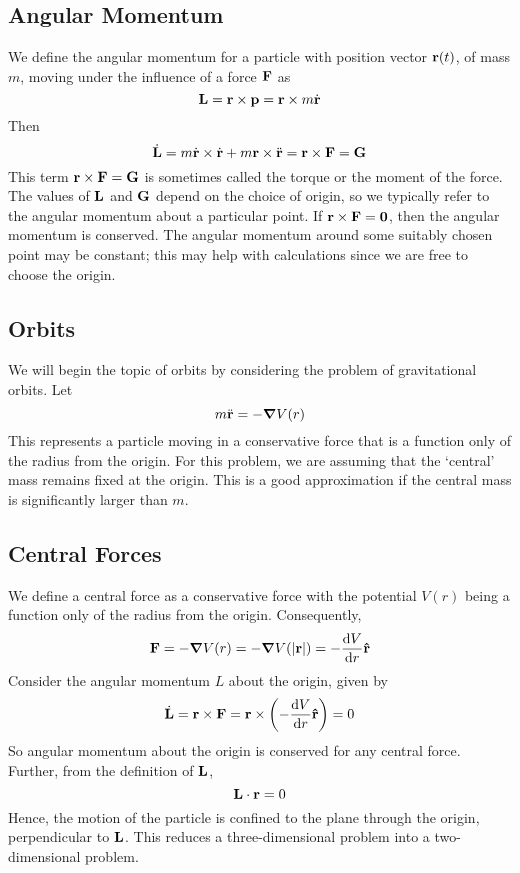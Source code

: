 \subsection{Angular Momentum}
We define the angular momentum for a particle with position vector \(\vb r(t)\), of mass \(m\), moving under the influence of a force \(\vb F\) as
\[ \vb L = \vb r \times \vb p = \vb r \times m \dot{\vb r} \]
Then
\[ \dot{\vb L} = m\dot{\vb r} \times \dot{\vb r} + m\vb r \times \ddot{\vb r} = \vb r \times \vb F = \vb G \]
This term \(\vb r \times \vb F = \vb G\) is sometimes called the torque or the moment of the force. The values of \(\vb L\) and \(\vb G\) depend on the choice of origin, so we typically refer to the angular momentum about a particular point. If \(\vb r \times \vb F = \vb 0\), then the angular momentum is conserved. The angular momentum around some suitably chosen point may be constant; this may help with calculations since we are free to choose the origin.

\subsection{Orbits}
We will begin the topic of orbits by considering the problem of gravitational orbits. Let
\[ m\ddot{\vb r} = -\grad V(r) \]
This represents a particle moving in a conservative force that is a function only of the radius from the origin. For this problem, we are assuming that the `central' mass remains fixed at the origin. This is a good approximation if the central mass is significantly larger than \(m\).

\subsection{Central Forces}
We define a central force as a conservative force with the potential \(V(r)\) being a function only of the radius from the origin. Consequently,
\[ \vb F = -\grad V(r) = -\grad V(\abs{\vb r}) = -\frac{\dd{V}}{\dd{r}}\vu{r} \]
Consider the angular momentum \(L\) about the origin, given by
\[ \dot{\vb L} = \vb r \times \vb F = \vb r \times \left(-\frac{\dd{V}}{\dd{r}}\vu{r}\right) = 0 \]
So angular momentum about the origin is conserved for any central force. Further, from the definition of \(\vb L\),
\[ \vb L \cdot \vb r = 0 \]
Hence, the motion of the particle is confined to the plane through the origin, perpendicular to \(\vb L\). This reduces a three-dimensional problem into a two-dimensional problem.

